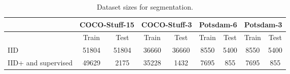 \begin{table}[t]
\fontsize{5.8}{8} \selectfont 
\centering
\begin{tabular}{l | c | c | c | c | c | c | c | c}
\hline
&  \multicolumn{2}{c}{COCO-Stuff-15} 
&  \multicolumn{2}{c}{COCO-Stuff-3}
&  \multicolumn{2}{c}{Potsdam-6}
&  \multicolumn{2}{c}{Potsdam-3}\\
\hline 
& Train & Test & Train & Test & Train & Test & Train & Test \\
\hline
IID & 51804 & 51804 & 36660 & 36660 & 8550 & 5400 & 8550 & 5400 \\
IID+ and supervised & 49629 & 2175 & 35228 & 1432 & 7695 & 855 & 7695 & 855\\
\hline
\end{tabular}
\caption{Dataset sizes for segmentation.}\label{t:seg_datasets}
\end{table}
